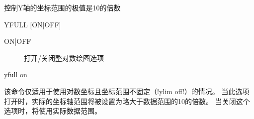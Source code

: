 \label{cmd:yfull}

控制Y轴的坐标范围的极值是10的倍数

\begin{SACSTX}
YFULL [ON|OFF]
\end{SACSTX}

\begin{description}
\item [ON|OFF] 打开/关闭整对数绘图选项
\end{description}

\begin{SACDFT}
yfull on
\end{SACDFT}

该命令仅适用于使用对数坐标且坐标范围不固定（!ylim off!）的情况。
当此选项打开时，实际的坐标轴范围将被设置为略大于数据范围的10的倍数。
当关闭这个选项时，将使用实际数据范围。
